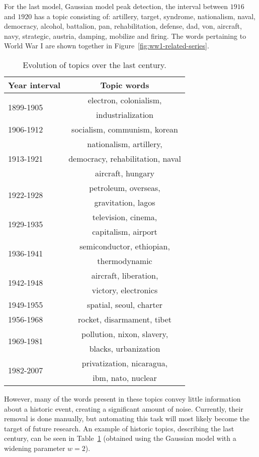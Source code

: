 For the last model, Gaussian model peak detection, the interval between $1916$ and $1920$ has a topic consisting of: artillery, target, syndrome, nationalism, naval, democracy, alcohol, battalion, pan, rehabilitation, defense, dad, von, aircraft, navy, strategic, austria, damping, mobilize and firing. The words pertaining to World War I are shown together in Figure~\ref{fig:ww1-related-series}.

\begin{table}[h]
\begin{center}
\begin{tabular}{|l|c|}
\hline \bf Year interval & \bf Topic words \\ \hline
\multirow{2}{*}{1899-1905} & electron, colonialism, \\
	& industrialization \\ \hline
1906-1912 & socialism, communism, korean \\ \hline
\multirow{3}{*}{1913-1921} & nationalism, artillery, \\
	& democracy, rehabilitation, naval \\
	& aircraft, hungary \\ \hline
\multirow{2}{*}{1922-1928} & petroleum, overseas, \\
	& gravitation, lagos \\ \hline
\multirow{2}{*}{1929-1935} & television, cinema, \\
	& capitalism, airport \\ \hline
\multirow{2}{*}{1936-1941} & semiconductor, ethiopian, \\
	& thermodynamic \\ \hline
\multirow{2}{*}{1942-1948} & aircraft, liberation, \\
	& victory, electronics \\ \hline
1949-1955 & spatial, seoul, charter \\ \hline
1956-1968 & rocket, disarmament, tibet \\ \hline
\multirow{2}{*}{1969-1981} & pollution, nixon, slavery, \\
	& blacks, urbanization \\ \hline
\multirow{2}{*}{1982-2007} & privatization, nicaragua, \\
	& ibm, nato, nuclear \\
\hline
\end{tabular}
\end{center}
\caption{\label{tbl:topic-evolution} Evolution of topics over the last century. }
\end{table}

However, many of the words present in these topics convey little information about a historic event, creating a significant amount of noise. Currently, their removal is done manually, but automating this task will most likely become the target of future research. An example of historic topics, describing the last century, can be seen in Table~\ref{tbl:topic-evolution} (obtained using the Gaussian model with a widening parameter $w = 2$).

